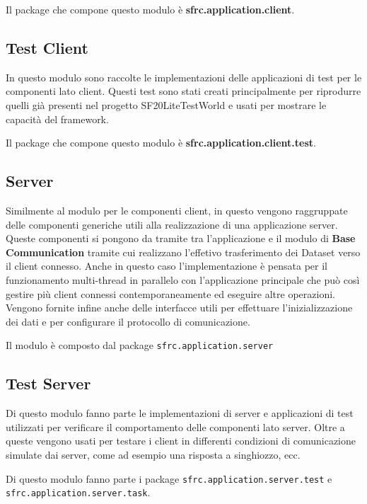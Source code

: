 Il package che compone questo modulo è \textbf{sfrc.application.client}.

\subsection{Test Client}
\label{sub:tclientmodule}
In questo modulo sono raccolte le implementazioni delle applicazioni di test per le componenti lato client. Questi test sono stati creati principalmente per riprodurre quelli già presenti nel progetto %
SF20LiteTestWorld e usati per mostrare le capacità del framework.

Il package che compone questo modulo è \textbf{sfrc.application.client.test}.

\subsection{Server}
\label{sub:servermodule}
Similmente al modulo per le componenti client, in questo vengono raggruppate delle componenti generiche utili alla realizzazione di una applicazione server. Queste componenti si pongono da tramite tra l'applicazione e il modulo di \textbf{Base Communication} tramite cui realizzano l'effetivo trasferimento dei Dataset verso il client connesso.
Anche in questo caso l'implementazione è pensata per il funzionamento multi-thread in parallelo con l'applicazione principale che può così gestire più client connessi contemporaneamente ed eseguire altre operazioni.
Vengono fornite infine anche delle interfacce utili per effettuare l'inizializzazione dei dati e per configurare il protocollo di comunicazione.

Il modulo è composto dal package \texttt{sfrc.application.server}

\subsection{Test Server}
\label{sub:tservermodule}
Di questo modulo fanno parte le implementazioni di server e applicazioni di test utilizzati per verificare il comportamento delle componenti lato server. Oltre a queste vengono usati per testare i client in differenti condizioni di comunicazione simulate dai server, come ad esempio una risposta a singhiozzo, ecc.

Di questo modulo fanno parte i package \texttt{sfrc.application.server.test} e \texttt{sfrc.application.server.task}.

